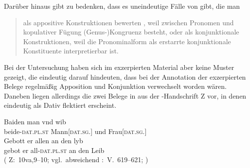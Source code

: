 Darüber hinaus gibt \citet{gjelsten1980} zu bedenken, dass es
uneindeutige Fälle von  gibt, die man
\blockcquote[187]{gjelsten1980}{als appositive Konstruktionen
bewerten , weil zwischen Pronomen und kopulativer Fügung
(Genus-)Kongruenz besteht, oder als konjunktionale
Konstruktionen, weil die Pronominalform als erstarrte konjunktionale
Konstituente interpretierbar ist.}

Bei der Untersuchung haben sich im exzerpierten Material aber keine Muster
gezeigt, die eindeutig darauf hindeuten, dass bei der Annotation der
exzerpierten Belege regelmäßig Apposition und Konjunktion
verwechselt worden wären. Daneben liegen allerdings die zwei Belege in
 aus der \KC{}-Handschrift Z vor, in denen
 eindeutig als Dativ flektiert erscheint.

\begin{exe}
\ex \label{ex:kczbeidenundesynt1}
\begin{xlist}
	\ex \label{ex:kczbeidenundesynt1_1}
		\gll Baiden man vnd wib \\
			beide-\textsc{dat.pl\subMF.st} Mann[\textsc{dat.sg.\MascM}] und
				Frau[\textsc{dat.sg.\NeutF}] \\
	\sn \gll Gebott er allen an den lyb \\
			gebot er all-\textsc{dat.pl\subMF.st} an den Leib \\
		\trans {}
			(%
				Z:~10va,9--10; vgl.~abweichend
				\KC:~V.~619--621;
				\cite[92]{schroeder1895}%
			)

\end{xlist}
\end{exe}

